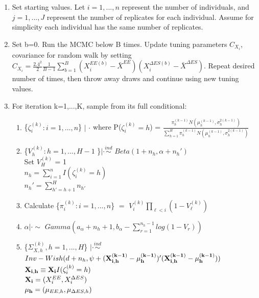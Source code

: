 \documentclass[11pt]{article}\usepackage[]{graphicx}\usepackage[]{color}
\begin{document}
\begin{enumerate}
\item
Set starting values. Let $i=1,...,n$ represent the number of individuals, and $j=1,...,J$ represent the number of replicates for each individual. Assume for simplicity each individual has the same number of replicates.

\item
Set b=0. Run the MCMC below B times. Update tuning parameters $C_{X_i}$, covariance for random walk by setting $C_{X_i} = \frac{2.4^2}{2} \frac{1}{B-1} \sum_{b=1}^{B} (X_i^{EE(b)}-\bar{X}^{EE})(X_i^{\Delta ES(b)}-\bar{X}^{\Delta ES})$. Repeat desired number of times, then throw away draws and continue using new tuning values. 

\item
For iteration k=1,...,K, sample from its full conditional:

\begin{enumerate}
\item
  \{$\zeta_i^{(k)}:i=1,...,n$\} $|$ $\cdot$  
 where P($\zeta_i^{(k)}=h$) = $\frac{\pi_h^{(k-1)} N(\mu_h^{(k-1)},\sigma_h^{2(k-1)})}{\sum_{h=1}^{H}\pi_h^{(k-1)} N(\mu_h^{(k-1)},\sigma_h^{2(k-1)})}$ \\

\item
 \{$V_h^{(k)}:h=1,...,H-1$ \}$|\cdot \overset{ind}{\sim}$  $Beta(1+n_h,\alpha+n_h')$ \\
Set $V_H^{(k)}$ = 1 \\
$n_h = \sum_{i=1}^{n} I(\zeta_i^{(k)}=h)$\\
$n_h' = \sum_{h'=h+1}^{H} n_{h'}$\\


\item
Calculate \{$\pi_i^{(k)}:i=1,...,n$\} $=$ $V_i^{(k)} \prod_{\ell < i} (1-V_{\ell}^{(k)})$


\item
$\alpha|\cdot \sim$ $Gamma(a_{\alpha}+n_h+1,b_{\alpha}-\sum_{r=1}^{n_h-1}log(1-V_r))$\\


\item
 \{$\Sigma_{X,h}^{(k)}, h=1,...,H$\} $|\cdot \overset{ind}{\sim}$ $Inv-Wish(d+n_h,\psi+({\bf X_{i,h}^{(k-1)} - \mu_h^{(k-1)}})'({\bf X_{i,h}^{(k-1)} - \mu_h^{(k-1)}}))$ \\

${\bf X_{i,h}} \equiv  {\bf X_i} I(\zeta_i^{(k)}=h)$ \\
${\bf X_i} = (X_i^{EE},X_i^{\Delta ES})$ \\
${\bf \mu_h} = (\mu_{EE,h},\mu_{\Delta ES,h})$




\end{enumerate}
\end{enumerate}
\end{document}
